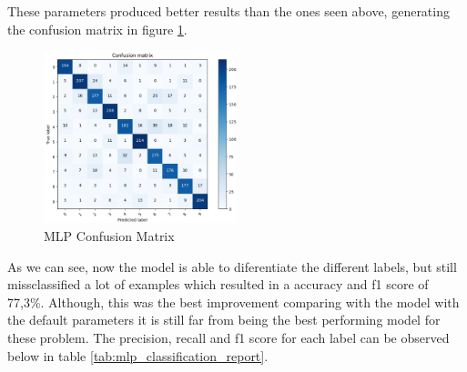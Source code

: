 \documentclass[conference]{IEEEtran}
\begin{document}
These parameters produced better results than the ones seen above, generating the confusion matrix in figure \ref{fig:mlp_confusion_matrix}.

\begin{figure}[!h]
    \centering
    \includegraphics[width=0.5\textwidth]{assets/mlp-confusion-matrix.png}
    \caption{MLP Confusion Matrix}
    \label{fig:mlp_confusion_matrix}
\end{figure}

As we can see, now the model is able to diferentiate the different labels, but still missclassified a lot of examples which resulted in a accuracy and f1 score of 77,3\%.
Although, this was the best improvement comparing with the model with the default parameters it is still far from being the best performing model for these problem.
The precision, recall and f1 score for each label can be observed below in table \ref{tab:mlp_classification_report}.
\end{document}
